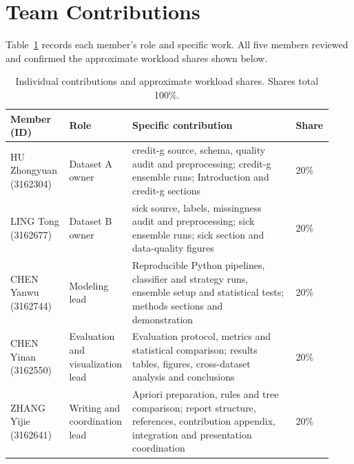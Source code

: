 \section*{Team Contributions}
\label{sec:contributions}

Table~\ref{tab:contributions} records each member's role and specific work. All five members reviewed and confirmed the approximate workload shares shown below.

\begin{table}[htbp]
\centering
\small
\caption{Individual contributions and approximate workload shares. Shares total 100\%.}
\label{tab:contributions}
\begin{tabular}{@{}p{0.18\linewidth}p{0.16\linewidth}p{0.50\linewidth}p{0.09\linewidth}@{}}
\toprule
Member (ID) & Role & Specific contribution & Share \\
\midrule
HU Zhongyuan (3162304) & Dataset A owner & credit-g source, schema, quality audit and preprocessing; credit-g ensemble runs; Introduction and credit-g sections & 20\% \\
LING Tong (3162677) & Dataset B owner & sick source, labels, missingness audit and preprocessing; sick ensemble runs; sick section and data-quality figures & 20\% \\
CHEN Yanwu (3162744) & Modeling lead & Reproducible Python pipelines, classifier and strategy runs, ensemble setup and statistical tests; methods sections and demonstration & 20\% \\
CHEN Yinan (3162550) & Evaluation and visualization lead & Evaluation protocol, metrics and statistical comparison; results tables, figures, cross-dataset analysis and conclusions & 20\% \\
ZHANG Yijie (3162641) & Writing and coordination lead & Apriori preparation, rules and tree comparison; report structure, references, contribution appendix, integration and presentation coordination & 20\% \\
\bottomrule
\end{tabular}
\end{table}

